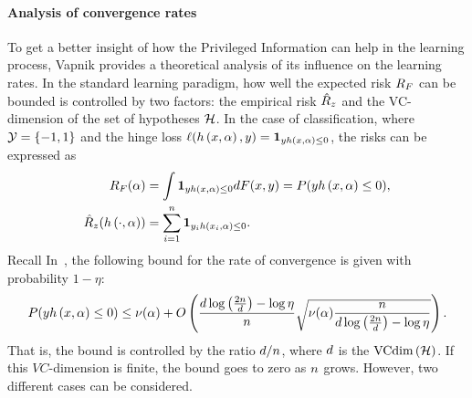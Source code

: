 \paragraph*{Analysis of convergence rates\\}
To get a better insight of how the Privileged Information can help in the learning process, Vapnik provides a theoretical analysis of its influence on the learning rates.
In the standard learning paradigm, how well the expected risk $R_F$ can be bounded is controlled by two factors: the empirical risk $\hat{R}_z$ and the VC-dimension of the set of hypotheses $\mathcal{\mathcal{H}}$.
In the case of classification, where $\mathcal{Y} = \left\{-1, 1\right\}$ and the hinge loss $\ell(h\left(x, \alpha\right), y) = \bm{1}_{y h\left(x, \alpha\right) \leq 0}$, the risks can be expressed as
\begin{align*}
    \nonumber
    R_F (\alpha) &= \int \bm{1}_{y h\left(x, \alpha\right) \leq 0} dF(x, y) =  P(y h\left(x, \alpha\right) \leq 0) ,\\
    \hat{R}_z(h\left(\cdot, \alpha\right)) &= \sum_{i=1}^n \bm{1}_{y_i h\left(x_i, \alpha\right) \leq 0} .
\end{align*}
Recall
In~\cite[Theorem~6.8]{vapnik1982estimation}, the following bound for the rate of convergence is given with probability $1 - \eta$:
\begin{equation}
    \nonumber
    P(y h\left(x, \alpha\right) \leq 0) \leq \nu(\alpha) + O\left( \frac{d \log\left(\frac{2n}{d} \right) - \log\eta}{n} \sqrt{\nu(\alpha) \frac{n}{d \log\left(\frac{2n}{d} \right) - \log\eta}}  \right) .
\end{equation}
That is, the bound is controlled by the ratio $d/n$, where $d$ is the $\text{VCdim}\left(\mathcal{H}\right)$. If this $VC$-dimension is finite, the bound goes to zero as $n$ grows.
However, two different cases can be considered.
\\

